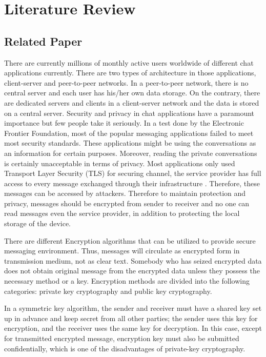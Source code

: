 \chapter{Literature Review}
\section{Related Paper}
There are currently millions of monthly active users worldwide of different chat applications currently. There are two types of architecture in those applications, client-server and peer-to-peer networks. In a peer-to-peer network, there is no central server and each user has his/her own data storage. On the contrary, there are dedicated servers and clients in a client-server network and the data is stored on a central server. Security and privacy in chat applications have a paramount importance but few people take it seriously. In a test done by the Electronic Frontier Foundation, most of the popular messaging applications failed to meet most security standards. These applications might be using the conversations as an information for certain purposes. Moreover, reading the private conversations is certainly unacceptable in terms of privacy.  Most applications only used Transport Layer Security (TLS) for securing channel, the service provider has full access to every message exchanged through their infrastructure . Therefore, these messages can be accessed by attackers. Therefore to maintain protection and privacy, messages should be encrypted from sender to receiver and no one can read messages even the service provider, in addition to protecting the local storage of the device.\cite{paley}

There are different Encryption algorithms that can  be utilized  to  provide secure  messaging environment. Thus, messages will circulate as  encrypted form in transmission medium, not as clear text. Somebody who has seized encrypted data does not obtain original message from the encrypted  data  unless they  possess  the  necessary  method or  a  key.  Encryption  methods  are divided into the following categories: private key cryptography and public key cryptography.

In a symmetric key algorithm, the sender and receiver must have a shared key set up in advance and keep secret from all other parties; the sender uses this key for encryption, and the receiver uses  the  same  key  for  decryption.  In  this  case,  except  for  transmitted  encrypted  message, encryption  key  must  also  be  submitted  confidentially,  which  is  one  of  the  disadvantages of private-key cryptography.

